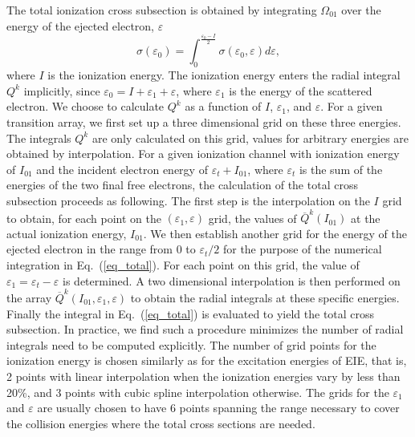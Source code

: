 The total ionization cross subsection is obtained by integrating $\Omega_{01}$
over the energy of the ejected electron, $\varepsilon$
\begin{equation}
\label{eq_total}
\sigma(\varepsilon_0) = \int\nolimits_0^{\frac{\varepsilon_0-I}{2}}
\sigma(\varepsilon_0,\varepsilon) d\varepsilon,
\end{equation}
where $I$ is the ionization energy. The ionization energy enters the radial
integral $Q^k$ implicitly, since $\varepsilon_0 = I+\varepsilon_1+\varepsilon$,
where $\varepsilon_1$ is the energy of the scattered electron. We choose to
calculate $Q^k$ as a function of $I$, $\varepsilon_1$, and $\varepsilon$. For a
given transition array, we first set up a three dimensional grid on these three
energies. The integrals $Q^k$ are  only calculated on this grid, values for
arbitrary energies are obtained by interpolation. For a given ionization channel
with ionization energy of $I_{01}$ and the incident electron energy of
$\varepsilon_t + I_{01}$, where $\varepsilon_t$ is the sum of the energies of
the two final free electrons, the calculation of the total cross subsection
proceeds as  following. The first step is the interpolation on the $I$ grid to
obtain, for each point on the $(\varepsilon_1,\varepsilon)$ grid, the values of
$\overline{Q}^k(I_{01})$ at the actual ionization energy, $I_{01}$. We then
establish another grid for the energy of the ejected electron in the range  from
0 to $\varepsilon_t/2$ for the purpose of the numerical integration in
Eq.~(\ref{eq_total}). For each  point on this grid, the value of $\varepsilon_1
= \varepsilon_t-\varepsilon$ is determined. A two dimensional interpolation is
then performed on the array $\overline{Q}^k(I_{01},\varepsilon_1,\varepsilon)$
to obtain the radial integrals at these specific  energies. Finally the integral
in Eq.~(\ref{eq_total}) is evaluated to yield the total cross subsection. In
practice, we find such a procedure minimizes the number of radial integrals need
to be computed explicitly. The number of grid points for the ionization energy
is chosen similarly as for the excitation energies of EIE, that is, 2 points
with linear interpolation when the ionization energies vary by less than 20\%,
and 3 points with cubic spline interpolation otherwise. The grids for the
$\varepsilon_1$ and $\varepsilon$ are usually chosen to have 6 points spanning
the range necessary to cover the collision energies where the total cross
sections are needed.

